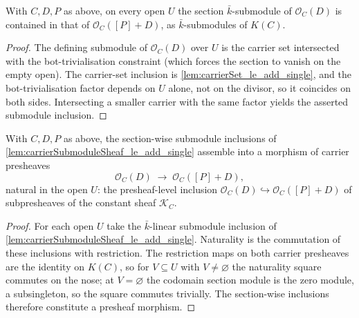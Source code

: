 \begin{lemma}

  \label{lem:carrierSubmoduleSheaf_le_add_single}
  With \(C, D, P\) as above, on every open \(U\) the section
  \(\bar k\)-submodule of \(\mathcal O_C(D)\) is contained in that of
  \(\mathcal O_C([P]+D)\), as \(\bar k\)-submodules of \(K(C)\).
\end{lemma}

\begin{proof}
  The defining submodule of \(\mathcal O_C(D)\) over \(U\) is the carrier set
  intersected with the bot-trivialisation constraint (which forces the
  section to vanish on the empty open). The carrier-set inclusion is
  \cref{lem:carrierSet_le_add_single}, and the bot-trivialisation factor
  depends on \(U\) alone, not on the divisor, so it coincides on both sides.
  Intersecting a smaller carrier with the same factor yields the asserted
  submodule inclusion.
\end{proof}

\begin{definition}

  \label{lem:carrierPresheaf_le_hom}
  With \(C, D, P\) as above, the section-wise submodule inclusions of
  \cref{lem:carrierSubmoduleSheaf_le_add_single} assemble into a morphism of
  carrier presheaves
  \[
    \mathcal O_C(D) \;\longrightarrow\; \mathcal O_C([P]+D),
  \]
  natural in the open \(U\): the presheaf-level inclusion
  \(\mathcal O_C(D) \hookrightarrow \mathcal O_C([P]+D)\) of subpresheaves of
  the constant sheaf \(\mathcal K_C\).
\end{definition}

\begin{proof}
  For each open \(U\) take the \(\bar k\)-linear submodule inclusion of
  \cref{lem:carrierSubmoduleSheaf_le_add_single}. Naturality is the
  commutation of these inclusions with restriction. The restriction maps on
  both carrier presheaves are the identity on \(K(C)\), so for
  \(V \subseteq U\) with \(V \neq \varnothing\) the naturality square
  commutes on the nose; at \(V = \varnothing\) the codomain section module is
  the zero module, a subsingleton, so the square commutes trivially. The
  section-wise inclusions therefore constitute a presheaf morphism.
\end{proof}

